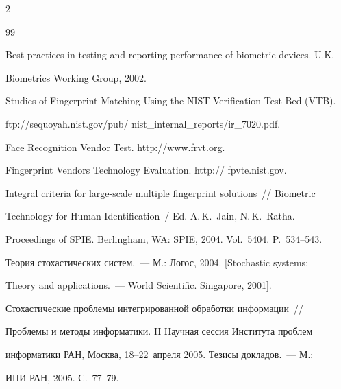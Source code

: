 \begin{multicols}{2}
{{\begin{thebibliography}{99}


Best practices in testing and reporting performance of biometric devices. U.K. 

Biometrics Working Group, 2002. 




Studies of Fingerprint Matching Using the NIST Verification Test Bed (VTB).  

{\sf  ftp://sequoyah.nist.gov/pub/ nist\_internal\_reports/ir\_7020.pdf}.




Face Recognition Vendor Test. {\sf  http://www.frvt.org}.




Fingerprint Vendors Technology Evaluation.  {\sf  http:// fpvte.nist.gov}.







Integral criteria for large-scale multiple fingerprint solutions~// Biometric 

Technology for Human Identification~/ Ed. A.\,K.~Jain, N.\,K.~Ratha. 

Proceedings of SPIE. Berlingham, WA: SPIE, 2004. Vol.~5404. P.~534--543.





Теория стохастических систем.~--- М.: Логос, 2004. [Stochastic systems: 

Theory and applications.~--- World Scientific. Singapore, 2001].





Стохастические проблемы интегрированной обработки информации~// 

Проблемы и методы информатики. II Научная сессия Института проблем 

информатики РАН, Москва, 18--22~апреля 2005. Тезисы докладов.~--- М.: 

ИПИ РАН, 2005. С.~77--79.




\end{thebibliography}}}
\end{multicols}
